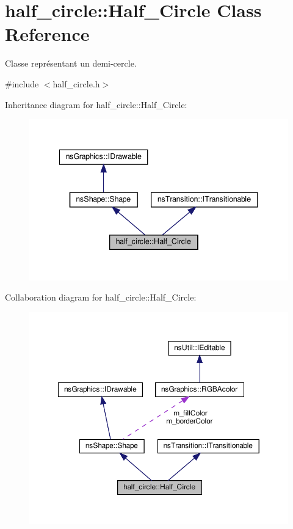 \hypertarget{classhalf__circle_1_1_half___circle}{}\section{half\+\_\+circle\+:\+:Half\+\_\+\+Circle Class Reference}
\label{classhalf__circle_1_1_half___circle}


Classe représentant un demi-\/cercle.  




{\ttfamily \#include $<$half\+\_\+circle.\+h$>$}



Inheritance diagram for half\+\_\+circle\+:\+:Half\+\_\+\+Circle\+:
\nopagebreak
\begin{figure}[H]
\begin{center}
\leavevmode
\includegraphics[width=341pt]{classhalf__circle_1_1_half___circle__inherit__graph}
\end{center}
\end{figure}


Collaboration diagram for half\+\_\+circle\+:\+:Half\+\_\+\+Circle\+:
\nopagebreak
\begin{figure}[H]
\begin{center}
\leavevmode
\includegraphics[width=350pt]{classhalf__circle_1_1_half___circle__coll__graph}
\end{center}
\end{figure}
